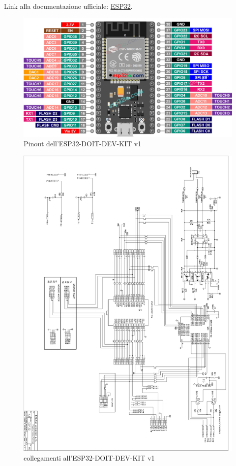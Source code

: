 \documentclass[12pt,a4paper]{report}
\begin{document}
Link alla documentazione ufficiale: \href{https://www.espressif.com/sites/default/files/documentation/esp32-wroom-32_datasheet_en.pdf}{ESP32}.

\begin{figure}[H]
    \centering
    \includegraphics[width=\linewidth]{../image/ESP-38Pin-pinout.jpg}
    \caption{Pinout dell'ESP32-DOIT-DEV-KIT v1}
\end{figure}


\begin{figure}[H]
    \centering
    \includegraphics[width=\linewidth]{../image/collegamenti_daESP.png}
    \caption{collegamenti all'ESP32-DOIT-DEV-KIT v1}
\end{figure}
\end{document}

